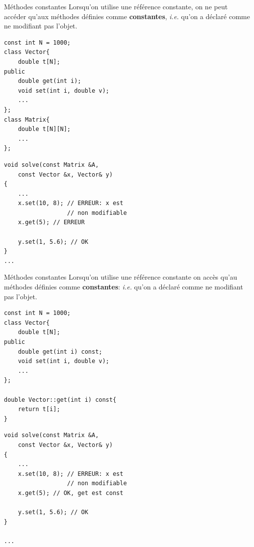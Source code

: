 \begin{frame}[fragile=singleslide]{Méthodes constantes}
    Lorsqu'on utilise une référence constante, on ne peut accéder qu'aux méthodes définies comme \textbf{constantes}, \textit{i.e.} qu'on a déclaré comme ne modifiant pas l'objet.

    \begin{minipage}{0.44\linewidth}
            \begin{verbatim}
const int N = 1000;
class Vector{
    double t[N];
public
    double get(int i);
    void set(int i, double v);
    ...
};
class Matrix{
    double t[N][N];
    ...
};
            \end{verbatim}
    \end{minipage}
    \hfill
    \begin{minipage}{0.50\linewidth}       
            \begin{verbatim}
void solve(const Matrix &A,
    const Vector &x, Vector& y)
{
    ...
    x.set(10, 8); // ERREUR: x est
                  // non modifiable
    x.get(5); // ERREUR

    y.set(1, 5.6); // OK
}
...
            \end{verbatim}
    \end{minipage}
\end{frame}


\begin{frame}[fragile=singleslide]{Méthodes constantes}
    Lorsqu'on utilise une référence constante on accès qu'au méthodes définies comme \textbf{constantes}: \textit{i.e.} qu'on a déclaré comme ne modifiant pas l'objet.

    \begin{minipage}{0.48\linewidth}
            \begin{verbatim}
const int N = 1000;
class Vector{
    double t[N];
public
    double get(int i) const;
    void set(int i, double v);
    ...
};

double Vector::get(int i) const{
    return t[i];
}

            \end{verbatim}
        
    \end{minipage}
    \hfill
    \begin{minipage}{0.50\linewidth}
        
            \begin{verbatim}
void solve(const Matrix &A,
    const Vector &x, Vector& y)
{
    ...
    x.set(10, 8); // ERREUR: x est
                  // non modifiable
    x.get(5); // OK, get est const

    y.set(1, 5.6); // OK
}

...
            \end{verbatim}
        
    \end{minipage}

\end{frame}

